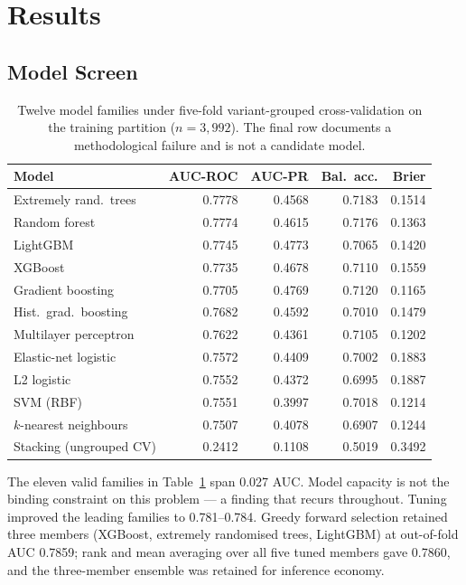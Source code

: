 \documentclass[conference]{IEEEtran}
\begin{document}
\section{Results}

\subsection{Model Screen}

\begin{table}[!t]
\caption{Twelve model families under five-fold variant-grouped
cross-validation on the training partition ($n = 3{,}992$). The final row
documents a methodological failure and is not a candidate model.}
\label{tab:screen}
\centering
\footnotesize
\begin{tabular}{lrrrr}
\toprule
Model & AUC-ROC & AUC-PR & Bal.\ acc. & Brier \\
\midrule
Extremely rand.\ trees   & 0.7778 & 0.4568 & 0.7183 & 0.1514 \\
Random forest            & 0.7774 & 0.4615 & 0.7176 & 0.1363 \\
LightGBM                 & 0.7745 & 0.4773 & 0.7065 & 0.1420 \\
XGBoost                  & 0.7735 & 0.4678 & 0.7110 & 0.1559 \\
Gradient boosting        & 0.7705 & 0.4769 & 0.7120 & 0.1165 \\
Hist.\ grad.\ boosting   & 0.7682 & 0.4592 & 0.7010 & 0.1479 \\
Multilayer perceptron    & 0.7622 & 0.4361 & 0.7105 & 0.1202 \\
Elastic-net logistic     & 0.7572 & 0.4409 & 0.7002 & 0.1883 \\
L2 logistic              & 0.7552 & 0.4372 & 0.6995 & 0.1887 \\
SVM (RBF)                & 0.7551 & 0.3997 & 0.7018 & 0.1214 \\
$k$-nearest neighbours   & 0.7507 & 0.4078 & 0.6907 & 0.1244 \\
\addlinespace
Stacking (ungrouped CV)  & 0.2412 & 0.1108 & 0.5019 & 0.3492 \\
\bottomrule
\end{tabular}
\end{table}

The eleven valid families in Table~\ref{tab:screen} span 0.027 AUC. Model
capacity is not the binding constraint on this problem --- a finding that
recurs throughout. Tuning improved the leading families to 0.781--0.784. Greedy
forward selection retained three members (XGBoost, extremely randomised trees,
LightGBM) at out-of-fold AUC 0.7859; rank and mean averaging over all five
tuned members gave 0.7860, and the three-member ensemble was retained for
inference economy.
\end{document}
